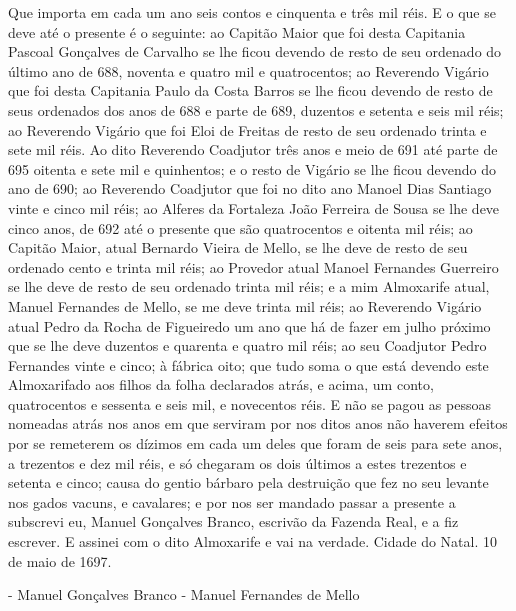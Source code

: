 \begin{refsection}
    Que importa em cada um ano seis contos e cinquenta e três mil réis. E o que se deve até o presente é o seguinte: ao Capitão Maior que foi desta Capitania Pascoal Gonçalves de Carvalho se lhe ficou devendo de resto de seu ordenado do último ano de 688, noventa e quatro mil e quatrocentos; ao Reverendo Vigário que foi desta Capitania Paulo da Costa Barros se lhe ficou devendo de resto de seus ordenados dos anos de 688 e parte de 689, duzentos e setenta e seis mil réis; ao Reverendo Vigário que foi Eloi de Freitas de resto de seu ordenado trinta e sete mil réis. Ao dito Reverendo Coadjutor três anos e meio de 691 até parte de 695 oitenta e sete mil e quinhentos; e o resto de Vigário se lhe ficou devendo do ano de 690; ao Reverendo Coadjutor que foi no dito ano Manoel Dias Santiago vinte e cinco mil réis; ao Alferes da Fortaleza João Ferreira de Sousa se lhe deve cinco anos, de 692 até o presente que são quatrocentos e oitenta mil réis; ao Capitão Maior, atual Bernardo Vieira de Mello, se lhe deve de resto de seu ordenado cento e trinta mil réis; ao Provedor atual Manoel Fernandes Guerreiro se lhe deve de resto de seu ordenado trinta mil réis; e a mim Almoxarife atual, Manuel Fernandes de Mello, se me deve trinta mil réis; ao Reverendo Vigário atual Pedro da Rocha de Figueiredo um ano que há de fazer em julho próximo que se lhe deve duzentos e quarenta e quatro mil réis; ao seu Coadjutor Pedro Fernandes vinte e cinco; à fábrica oito; que tudo soma o que está devendo este Almoxarifado aos filhos da folha declarados atrás, e acima, um conto, quatrocentos e sessenta e seis mil, e novecentos réis. E não se pagou as pessoas nomeadas atrás nos anos em que serviram por nos ditos anos não haverem efeitos por se remeterem os dízimos em cada um deles que foram de seis para sete anos, a trezentos e dez mil réis, e só chegaram os dois últimos a estes trezentos e setenta e cinco; causa do gentio bárbaro pela destruição que fez no seu levante nos gados vacuns, e cavalares; e por nos ser mandado passar a presente a subscrevi eu, Manuel Gonçalves Branco, escrivão da Fazenda Real, e a fiz escrever. E assinei com o dito Almoxarife e vai na verdade. Cidade do Natal. 10 de maio de 1697.  

    \vspace{1em}

    \noindent{}- Manuel Gonçalves Branco - Manuel Fernandes de Mello
    
    \nocite{JORGEAndJorge2000500}

    \printbibliography[heading=subbibliography,notcategory=fullcited]

    \label{chap:presidio-de-acuend}

\end{refsection}
